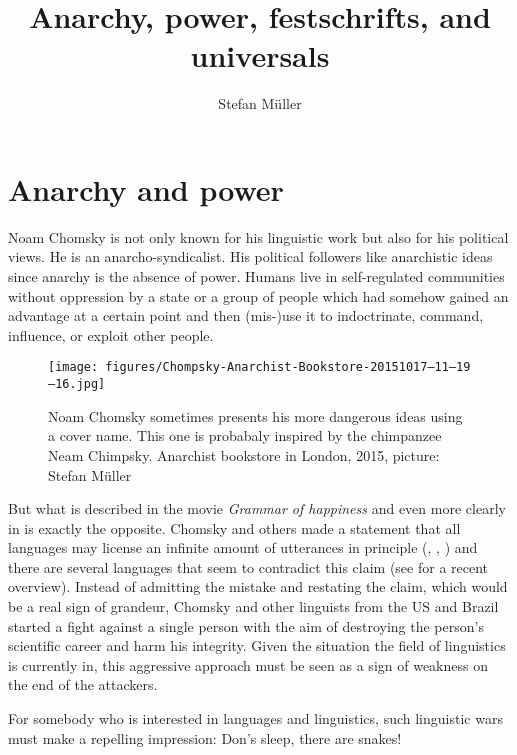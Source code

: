\documentclass[output=paper,colorlinks,citecolor=brown]{langscibook}
\title{Anarchy, power, festschrifts, and universals}
\author{Stefan Müller\orcid{0000—0003—4413—5313}\affiliation{Humboldt-Universität zu Berlin}}
\begin{document}
\maketitle

\section{Anarchy and power} 

Noam Chomsky is not only known for his linguistic work but also for his political views. He is an
anarcho-syndicalist. His political followers like anarchistic ideas since anarchy is the absence of
power. Humans live in self-regulated communities without oppression by a state or a group of
people which had somehow gained an advantage at a certain point and then (mis-)use it to indoctrinate, command, influence, or
exploit other people.

\begin{figure}
\texttt{[image: figures/Chompsky-Anarchist-Bookstore-20151017—11—19—16.jpg]}
\caption{Noam Chomsky sometimes presents his more dangerous ideas using a cover name. This one is
  probabaly inspired by the chimpanzee Neam Chimpsky. Anarchist
  bookstore in London, 2015, picture: Stefan Müller}
\end{figure}

But what is described in the movie \emph{Grammar of happiness}  and even more clearly
in  is exactly the opposite. Chomsky and others made a statement that all languages may license an infinite amount of utterances in principle (\citealt*[]{HCF2002a}, \citealt[]{EH2005a-u}, \citealt*[]{HNG2005a}) and there are several languages that seem to contradict this claim (see
 for a recent overview). Instead of
admitting the mistake and restating the claim, which would be a real sign of grandeur, Chomsky and
other linguists from the US and Brazil started a fight against a single person with the aim of destroying the
person's scientific career and harm his integrity. Given the situation the field of linguistics is currently in,
this aggressive approach must be seen as a sign of weakness on the end of the attackers.

For somebody who is interested in languages and linguistics, such linguistic wars \citep{Harris93a} must make a
repelling impression: Don's sleep, there are snakes!    
\end{document}
